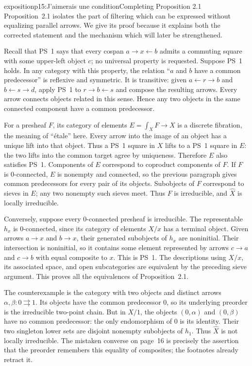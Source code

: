 \begin{dcomment}{exposition}{p15:J'aimerais une condition}{Completing Proposition 2.1}
Proposition~2.1 isolates the part of filtering which can be expressed without equalizing parallel arrows. We give its proof because it explains both the corrected statement and the mechanism which will later be strengthened.

Recall that PS~1 says that every cospan $a\to x\leftarrow b$ admits a commuting square with some upper-left object $c$; no universal property is requested. Suppose PS~1 holds. In any category with this property, the relation ``$a$ and $b$ have a common predecessor'' is reflexive and symmetric. It is transitive: given $a\leftarrow r\to b$ and $b\leftarrow s\to d$, apply PS~1 to $r\to b\leftarrow s$ and compose the resulting arrows. Every arrow connects objects related in this sense. Hence any two objects in the same connected component have a common predecessor.

For a presheaf $F$, its category of elements $E=\int_XF\to X$ is a discrete fibration, the meaning of ``\'etale'' here. Every arrow into the image of an object has a unique lift into that object. Thus a PS~1 square in $X$ lifts to a PS~1 square in $E$: the two lifts into the common target agree by uniqueness. Therefore $E$ also satisfies PS~1. Components of $E$ correspond to coproduct components of $F$. If $F$ is $0$-connected, $E$ is nonempty and connected, so the previous paragraph gives common predecessors for every pair of its objects. Subobjects of $F$ correspond to sieves in $E$; any two nonempty such sieves meet. Thus $F$ is irreducible, and $\widehat X$ is locally irreducible.

Conversely, suppose every $0$-connected presheaf is irreducible. The representable $h_x$ is $0$-connected, since its category of elements $X/x$ has a terminal object. Given arrows $a\to x$ and $b\to x$, their generated subobjects of $h_x$ are noninitial. Their intersection is noninitial, so it contains some element represented by arrows $c\to a$ and $c\to b$ with equal composite to $x$. This is PS~1. The descriptions using $X/x$, its associated space, and open subcategories are equivalent by the preceding sieve argument. This proves all the equivalences of Proposition~2.1.

The counterexample is the category with two objects and distinct arrows $\alpha,\beta:0\rightrightarrows1$. Its objects have the common predecessor $0$, so its underlying preorder is the irreducible two-point chain. But in $X/1$, the objects $(0,\alpha)$ and $(0,\beta)$ have no common predecessor: the only endomorphism of $0$ is its identity. Their two singleton lower sets are disjoint nonempty subobjects of $h_1$. Thus $\widehat X$ is not locally irreducible. The mistaken converse on page~16 is precisely the assertion that the preorder remembers this equality of composites; the footnotes already retract it.
\end{dcomment}

